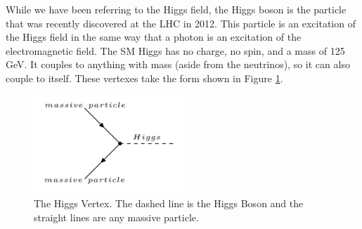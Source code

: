 While we have been referring to the Higgs field, the Higgs boson is the particle that was recently discovered at the LHC in 2012. This particle is an excitation of the Higgs field in the same way that a photon is an excitation of the electromagnetic field. The SM Higgs has no charge, no spin, and a mass of 125 GeV. It couples to anything with mass (aside from the neutrinos), so it can also couple to itself. These vertexes take the form shown in Figure \ref{Fig:Intro:Vertex4}.
\begin{figure}[h]
    \centering
        \includegraphics[width=0.5\textwidth]{F1/Vertex4}
        \caption{The Higgs Vertex. The dashed line is the Higgs Boson and the straight lines are any massive particle.}
        \label{Fig:Intro:Vertex4}
\end{figure}

